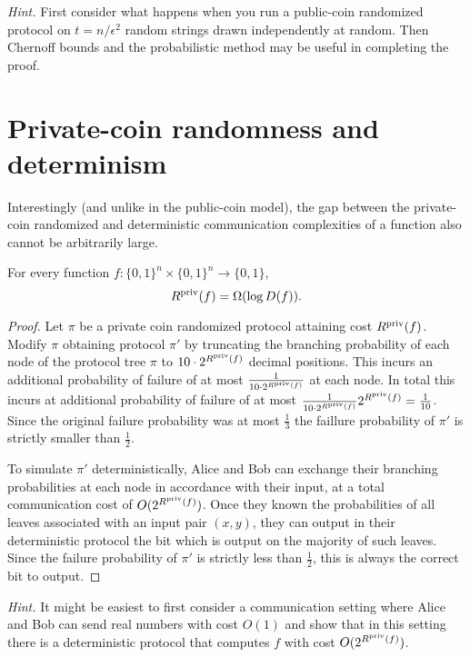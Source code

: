 \bigskip
\begin{remark}
\emph{Hint.} First consider what happens when you run a public-coin randomized protocol on $t = n/\epsilon^2$ random strings drawn independently at random. Then Chernoff bounds and the probabilistic method may be useful in completing the proof.
\end{remark}


\newpage 
\section{Private-coin randomness and determinism}

Interestingly (and unlike in the public-coin model), the gap between the private-coin randomized and deterministic communication complexities of a function also cannot be arbitrarily large. 

\begin{theorem}
For every function $f : \{0,1\}^n \times \{0,1\}^n \to \{0,1\}$,
\[
R^{\mathrm{priv}}(f) = \Omega( \log D(f)).
\]
\end{theorem}

\begin{proof}
Let $\pi$ be a private coin randomized protocol attaining cost $R^{\mathrm{priv}}(f)$. Modify $\pi$ obtaining protocol $\pi'$ by truncating the branching probability of each node of the protocol tree $\pi$ to $10\cdot 2^{R^{\mathrm{priv}}(f)}$ decimal positions. This incurs an additional probability of failure of at most $\frac{1}{10\cdot 2^{R^{\mathrm{priv}}(f)}}$ at each node. In total this incurs at additional probability of failure of at most $\frac{1}{10\cdot 2^{R^{\mathrm{priv}}(f)}}2^{R^{\mathrm{priv}}(f)} = \frac{1}{10}$. Since the original failure probability was at most $\frac{1}{3}$ the faillure probability of $\pi'$ is strictly smaller than $\frac{1}{2}$.

To simulate $\pi'$ deterministically, Alice and Bob can exchange their branching probabilities at each  node in accordance with their input, at a total communication cost of $O(2^{R^{\mathrm{priv}}(f)})$. Once they known the probabilities of all leaves associated with an input pair $(x,y)$, they can output in their deterministic protocol the bit which is output on the majority of such leaves. Since the failure probability of $\pi'$ is strictly less than $\frac{1}{2}$, this is always the correct bit to output.
\end{proof}

\bigskip
\begin{remark}
\emph{Hint.} It might be easiest to first consider a communication setting where Alice and Bob can send real numbers with cost $O(1)$ and show that in this setting there is a deterministic protocol that computes $f$ with cost $O(2^{R^{\mathrm{priv}}(f)})$.
\end{remark}

